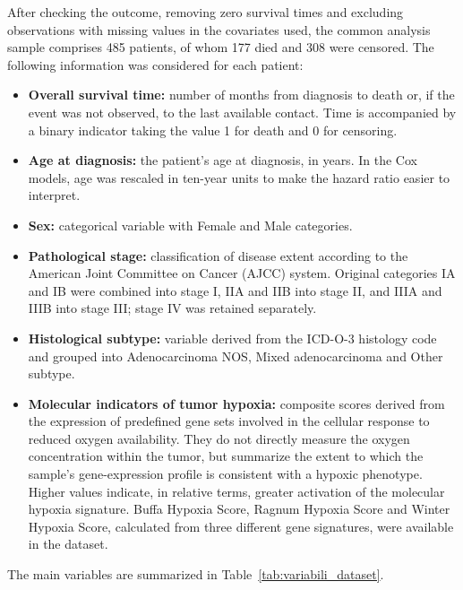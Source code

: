 \documentclass[12pt,a4paper]{article}
\begin{document}
After checking the outcome, removing zero survival times and excluding observations with missing values in the covariates used, the common analysis sample comprises 485 patients, of whom 177 died and 308 were censored. The following information was considered for each patient:

\begin{itemize}

    \item \textbf{Overall survival time:} number of months from diagnosis to death or, if the event was not observed, to the last available contact. Time is accompanied by a binary indicator taking the value 1 for death and 0 for censoring.

    \item \textbf{Age at diagnosis:} the patient's age at diagnosis, in years. In the Cox models, age was rescaled in ten-year units to make the hazard ratio easier to interpret.

    \item \textbf{Sex:} categorical variable with Female and Male categories.

    \item \textbf{Pathological stage:} classification of disease extent according to the American Joint Committee on Cancer (AJCC) system. Original categories IA and IB were combined into stage I, IIA and IIB into stage II, and IIIA and IIIB into stage III; stage IV was retained separately.

    \item \textbf{Histological subtype:} variable derived from the ICD-O-3 histology code and grouped into Adenocarcinoma NOS, Mixed adenocarcinoma and Other subtype.

    \item \textbf{Molecular indicators of tumor hypoxia:} composite scores derived from the expression of predefined gene sets involved in the cellular response to reduced oxygen availability. They do not directly measure the oxygen concentration within the tumor, but summarize the extent to which the sample's gene-expression profile is consistent with a hypoxic phenotype. Higher values indicate, in relative terms, greater activation of the molecular hypoxia signature. Buffa Hypoxia Score, Ragnum Hypoxia Score and Winter Hypoxia Score, calculated from three different gene signatures, were available in the dataset.

\end{itemize}

The main variables are summarized in Table~\ref{tab:variabili_dataset}.
\end{document}
